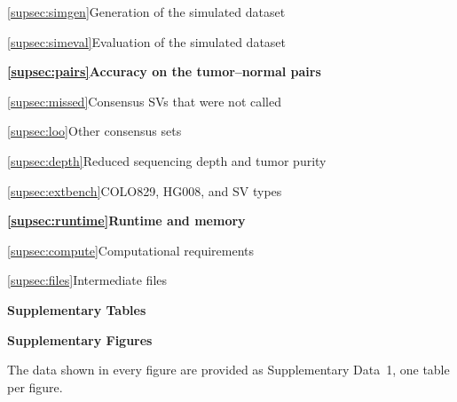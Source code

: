 \noindent\hspace{1.5em}\ref{supsec:simgen}\quad Generation of the simulated dataset\dotfill\pageref{supsec:simgen}\par
\noindent\hspace{1.5em}\ref{supsec:simeval}\quad Evaluation of the simulated dataset\dotfill\pageref{supsec:simeval}\par
\medskip\noindent\textbf{\ref{supsec:pairs}\quad Accuracy on the tumor--normal pairs}\dotfill\pageref{supsec:pairs}\par
\noindent\hspace{1.5em}\ref{supsec:missed}\quad Consensus SVs that were not called\dotfill\pageref{supsec:missed}\par
\noindent\hspace{1.5em}\ref{supsec:loo}\quad Other consensus sets\dotfill\pageref{supsec:loo}\par
\noindent\hspace{1.5em}\ref{supsec:depth}\quad Reduced sequencing depth and tumor purity\dotfill\pageref{supsec:depth}\par
\noindent\hspace{1.5em}\ref{supsec:extbench}\quad COLO829, HG008, and SV types\dotfill\pageref{supsec:extbench}\par
\medskip\noindent\textbf{\ref{supsec:runtime}\quad Runtime and memory}\dotfill\pageref{supsec:runtime}\par
\noindent\hspace{1.5em}\ref{supsec:compute}\quad Computational requirements\dotfill\pageref{supsec:compute}\par
\noindent\hspace{1.5em}\ref{supsec:files}\quad Intermediate files\dotfill\pageref{supsec:files}\par
\medskip\noindent\textbf{Supplementary Tables}\dotfill\pageref{supsec:tables}\par
\medskip\noindent\textbf{Supplementary Figures}\dotfill\pageref{supsec:figures}\par

\medskip\noindent The data shown in every figure are provided as Supplementary Data~1, one table per figure.

\bigskip


